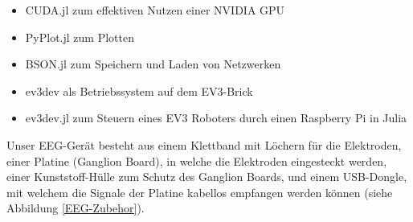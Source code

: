 \documentclass[11pt]{scrartcl}
\begin{document}
\begin{itemize}
\begin{itemize}
			\item CUDA.jl zum effektiven Nutzen einer NVIDIA GPU
				\cite{CUDA}
			
			\item PyPlot.jl zum Plotten
				\cite{pyplot}
			
			\item BSON.jl zum Speichern und Laden von Netzwerken
			
			\item ev3dev als Betriebssystem auf dem EV3-Brick \cite{ev3dev-docs}
			
			\item ev3dev.jl zum Steuern eines EV3 Roboters durch einen Raspberry Pi in Julia
				\cite{ev3dev}

			
		\end{itemize}

	\end{itemize}

	\begin{figure}[h!]
	\end{figure}

	Unser EEG-Gerät besteht aus einem Klettband mit Löchern für die Elektroden, einer Platine (Ganglion Board), in welche die Elektroden eingesteckt werden, einer Kunststoff-Hülle zum Schutz des Ganglion Boards, und einem USB-Dongle, mit welchem die Signale der Platine kabellos empfangen werden können (siehe Abbildung \ref{EEG-Zubehor}).
\end{document}
